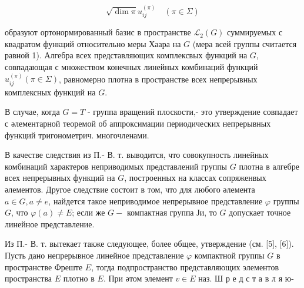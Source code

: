 \documentclass[10pt]{article}
\begin{document}
\[
\sqrt{\operatorname{dim} \pi} u_{i j}^{(\pi)} \quad(\pi \in \Sigma)
\]

образуют ортонормированный базис в пространстве $\mathscr{L}_{2}(G)$ суммируемых с квадратом функций относительно меры Хаара на $G$ (мера всей группы считается равной 1). Алгебра всех представляющих комплексвых функций на $G$, совпадающая с множеством конечных линейных комбинаций функций $u_{i j}^{(\pi)}(\pi \in \Sigma)$, равномерно плотна в пространстве всех непрерывных комплексных функций на $G$.

В случае, когда $G=T$ - группа вращений плоскости,- это утверждение совпадает с әлементарной теоремой об аппроксимации периодических непрерывных функций тригонометрич. многочленами.

В качестве следствия из П.- В. т. выводится, что совокупность линейных комбинаций характеров неприводимых представлений группы $G$ плотна в алгебре всех непрерывных функций на $G$, построенных на классах сопряженвых әлементов. Другое следствие состоит в том, что для любого әлемента $a \in G, a \neq e$, найдется такое неприводимое непрерывное представление $\varphi$ группы $G$, что $\varphi(a) \neq E$; если же $G-$ компактная группа Ји, то $G$ допускает точное линейное представление.

Из П.- В. т. вытекает также следующее, более общее, утверждение (см. [5], [6]). Пусть дано непрерывное линейное представление $\varphi$ компактной группы $G$ в пространстве Фреште $E$, тогда подпространство представляющих элементов пространства $E$ плотно в $E$. При әтом элемент $v \in E$ наз. Ш р е д с т а в л я ю-
\end{document}
